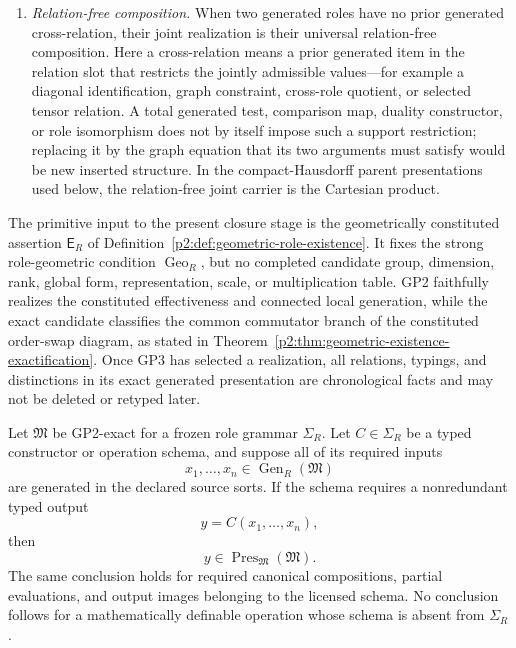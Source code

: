\documentclass[12pt,a4paper]{article}
\begin{document}
\begin{mdframed}[style=postulatebox,nobreak=false]
\begin{postulate}
\begin{enumerate}[label=(\alph*),leftmargin=2em]
\item \emph{Relation-free composition.}  When two generated roles have no
prior generated cross-relation, their joint realization is their universal
relation-free composition.  Here a cross-relation means a prior generated
item in the relation slot that restricts the jointly admissible values---for
example a diagonal identification, graph constraint, cross-role quotient, or
selected tensor relation.  A total generated test, comparison map, duality
constructor, or role isomorphism does not by itself impose such a support
restriction; replacing it by the graph equation that its two arguments must
satisfy would be new inserted structure.  In the compact-Hausdorff parent
presentations used below, the relation-free joint carrier is the Cartesian
product.
\end{enumerate}

The primitive input to the present closure stage is the geometrically
constituted assertion \(\mathsf E_R\) of
Definition~\ref{p2:def:geometric-role-existence}.  It fixes the strong
role-geometric condition \(\operatorname{Geo}_R\), but no completed candidate
group, dimension, rank, global form, representation, scale, or multiplication
table.  GP2 faithfully realizes the constituted effectiveness and connected
local generation, while the exact candidate classifies the common commutator
branch of the constituted order-swap diagram, as stated in
Theorem~\ref{p2:thm:geometric-existence-exactification}.  Once GP3 has selected
a realization, all relations, typings, and distinctions in its exact generated
presentation are chronological facts and may not be deleted or retyped later.
\end{postulate}
\end{mdframed}

\begin{corollary}
\label{p2:cor:no-idle-licensed-constructor}
Let \(\mathfrak M\) be GP2-exact for a frozen role grammar \(\Sigma_R\).  Let
\(C\in\Sigma_R\) be a typed constructor or operation schema, and suppose all of
its required inputs
\[
 x_1,\ldots,x_n\in\operatorname{Gen}_R(\mathfrak M)
\]
are generated in the declared source sorts.  If the schema requires a
nonredundant typed output
\[
 y=C(x_1,\ldots,x_n),
\]
then
\[
 \boxed{y\in\operatorname{Pres}_{\mathfrak M}(\mathfrak M)}.
\]
The same conclusion holds for required canonical compositions, partial
evaluations, and output images belonging to the licensed schema.  No conclusion
follows for a mathematically definable operation whose schema is absent from
\(\Sigma_R\).
\end{corollary}
\end{document}
